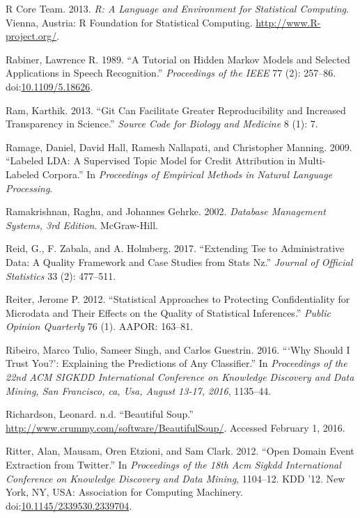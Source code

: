 \documentclass[]{krantz}
\begin{document}
\hypertarget{ref-cran2013}{}
R Core Team. 2013. \emph{R: A Language and Environment for Statistical
Computing}. Vienna, Austria: R Foundation for Statistical Computing.
\url{http://www.R-project.org/}.

\hypertarget{ref-rabiner-89}{}
Rabiner, Lawrence R. 1989. ``A Tutorial on Hidden Markov Models and
Selected Applications in Speech Recognition.'' \emph{Proceedings of the
IEEE} 77 (2): 257--86.
doi:\href{https://doi.org/10.1109/5.18626}{10.1109/5.18626}.

\hypertarget{ref-ram2013git}{}
Ram, Karthik. 2013. ``Git Can Facilitate Greater Reproducibility and
Increased Transparency in Science.'' \emph{Source Code for Biology and
Medicine} 8 (1): 7.

\hypertarget{ref-ramage-09}{}
Ramage, Daniel, David Hall, Ramesh Nallapati, and Christopher Manning.
2009. ``Labeled LDA: A Supervised Topic Model for Credit Attribution in
Multi-Labeled Corpora.'' In \emph{Proceedings of Empirical Methods in
Natural Language Processing}.

\hypertarget{ref-ramakrishnan2000database}{}
Ramakrishnan, Raghu, and Johannes Gehrke. 2002. \emph{Database
Management Systems, 3rd Edition}. McGraw-Hill.

\hypertarget{ref-Reid2017}{}
Reid, G., F. Zabala, and A. Holmberg. 2017. ``Extending Tse to
Administrative Data: A Quality Framework and Case Studies from Stats
Nz.'' \emph{Journal of Official Statistics} 33 (2): 477--511.

\hypertarget{ref-reiter2012statistical}{}
Reiter, Jerome P. 2012. ``Statistical Approaches to Protecting
Confidentiality for Microdata and Their Effects on the Quality of
Statistical Inferences.'' \emph{Public Opinion Quarterly} 76 (1). AAPOR:
163--81.

\hypertarget{ref-ribeiro-16}{}
Ribeiro, Marco Tulio, Sameer Singh, and Carlos Guestrin. 2016. ```Why
Should I Trust You?': Explaining the Predictions of Any Classifier.'' In
\emph{Proceedings of the 22nd ACM SIGKDD International Conference on
Knowledge Discovery and Data Mining, San Francisco, ca, Usa, August
13-17, 2016}, 1135--44.

\hypertarget{ref-bsoup}{}
Richardson, Leonard. n.d. ``Beautiful Soup.''
\url{http://www.crummy.com/software/BeautifulSoup/}. Accessed February
1, 2016.

\hypertarget{ref-Ritter2012}{}
Ritter, Alan, Mausam, Oren Etzioni, and Sam Clark. 2012. ``Open Domain
Event Extraction from Twitter.'' In \emph{Proceedings of the 18th Acm
Sigkdd International Conference on Knowledge Discovery and Data Mining},
1104--12. KDD '12. New York, NY, USA: Association for Computing
Machinery.
doi:\href{https://doi.org/10.1145/2339530.2339704}{10.1145/2339530.2339704}.
\end{document}
